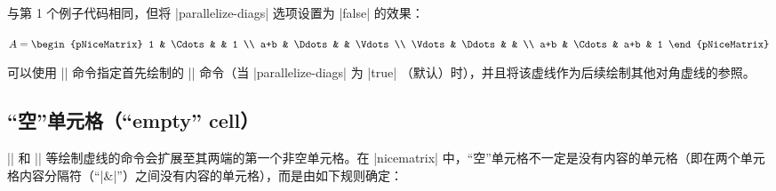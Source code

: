 \documentclass[dvipsnames]{article}%
\begin{document}
\begin{scope}
\medskip
{}%
\begin{minipage}{9.5cm}
与第 1 个例子代码相同，但将 |parallelize-diags| 选项设置为 |false| 的效果：
\end{minipage}
$A = \begin{pNiceMatrix}
1      & \Cdots  &     & 1      \\
a+b    & \Ddots  &     & \Vdots \\
\Vdots & \Ddots  &     &        \\
a+b    & \Cdots  & a+b & 1
\end{pNiceMatrix}$

\end{scope}

\medskip

可以使用 || 命令指定首先绘制的 |\Ddots| 命令（当 |parallelize-diags| 为 |true| （默认）时），并且将该虚线作为后续绘制其他对角虚线的参照。

\subsection{“空”单元格（“empty” cell）}

\label{empty-cells}
|\Ldots| 和 |\Cdots| 等绘制虚线的命令会扩展至其两端的第一个非空单元格。在 |nicematrix| 中，“空”单元格不一定是没有内容的单元格（即在两个单元格内容分隔符（“|&|”）之间没有内容的单元格），而是由如下规则确定：
\end{document}
